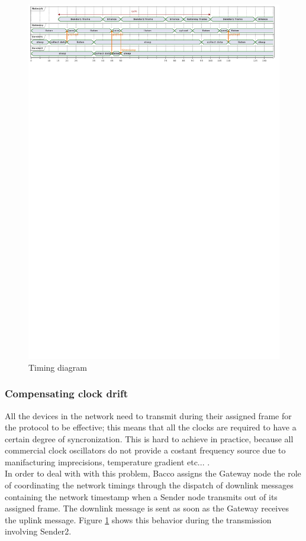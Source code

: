 \begin{figure}
    \centering
    \includegraphics[clip, trim=0cm 25.2cm 0cm 0cm, width=1.0\textwidth]{uml/timings.pdf}
    \caption{Timing diagram}
    \label{timing diagram}
\end{figure}

\subsubsection{Compensating clock drift}
All the devices in the network need to transmit during their assigned frame for the protocol to be effective; this means
that all the clocks are required to have a certain degree of syncronization. This is hard to achieve in
practice, because all commercial clock oscillators do not provide a costant frequency source due to manifacturing imprecisions,
temperature gradient etc... .\\
In order to deal with with this problem, Bacco assigns the Gateway node the role of coordinating the network timings through
the dispatch of downlink messages containing the network timestamp when a Sender
node transmits out of its assigned frame. The downlink message is sent as soon as the Gateway receives the uplink
message. Figure \ref{timing diagram} shows this behavior during the transmission involving Sender2.

